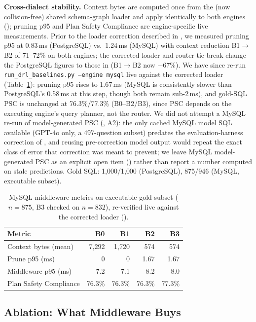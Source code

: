 \documentclass[twocolumn]{svjour3}
\begin{document}
\textbf{Cross-dialect stability.} Context bytes are computed once from the (now collision-free) shared schema-graph loader and apply identically to both engines (); pruning p95 and Plan Safety Compliance are engine-specific live measurements.
Prior to the loader correction described in , we measured pruning p95 at 0.83\,ms (PostgreSQL) vs.\ 1.24\,ms (MySQL) with context reduction B1$\rightarrow$B2 of 71--72\% on both engines; the corrected loader and router tie-break change the PostgreSQL figures to those in  (B1$\to$B2 now $-$67\%). We have since re-run \texttt{run\_drl\_baselines.py --engine mysql} live against the corrected loader (Table~\ref{tab:mysql}): pruning p95 rises to 1.67\,ms (MySQL is consistently slower than PostgreSQL's 0.58\,ms at this step, though both remain sub-2\,ms), and gold-SQL PSC is unchanged at 76.3\%/77.3\% (B0--B2/B3), since PSC depends on the executing engine's query planner, not the router. We did not attempt a MySQL re-run of model-generated PSC (, A2): the only cached MySQL model SQL available (GPT-4o only, a 497-question subset) predates the evaluation-harness correction of , and reusing pre-correction model output would repeat the exact class of error that correction was meant to prevent; we leave MySQL model-generated PSC as an explicit open item () rather than report a number computed on stale predictions.
Gold SQL: 1{,}000/1{,}000 (PostgreSQL), 875/946 (MySQL, executable subset).

\begin{table}[t]
\centering
\caption{MySQL middleware metrics on executable gold subset ($n{=}875$, B3 checked on $n{=}832$), re-verified live against the corrected loader ().}
\label{tab:mysql}
\small
\begin{tabular}{@{}lrrrr@{}}
\toprule
\textbf{Metric} & \textbf{B0} & \textbf{B1} & \textbf{B2} & \textbf{B3} \\
\midrule
Context bytes (mean) & 7{,}292 & 1{,}720 & 574 & 574 \\
Prune p95 (ms) & 0 & 0 & 1.67 & 1.67 \\
Middleware p95 (ms) & 7.2 & 7.1 & 8.2 & 8.0 \\
Plan Safety Compliance & 76.3\% & 76.3\% & 76.3\% & 77.3\% \\
\bottomrule
\end{tabular}
\end{table}

\subsection{Ablation: What Middleware Buys}
\label{sec:ablation}
\end{document}
